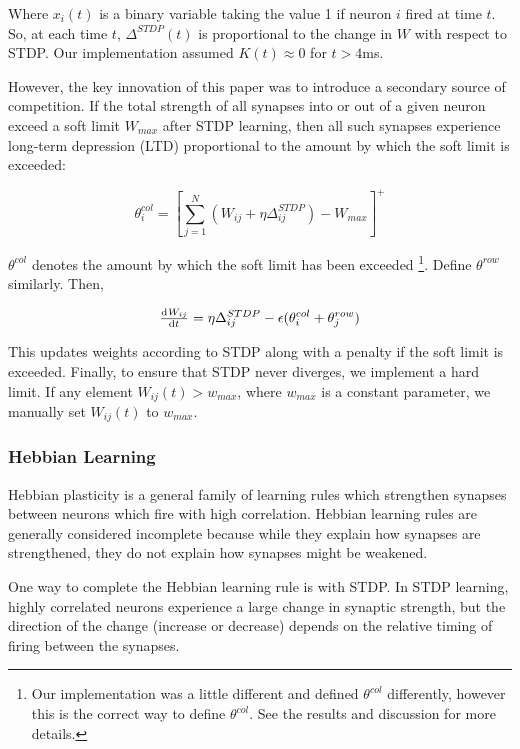Where \(x_i(t)\) is a binary variable taking the value 1 if neuron \(i\) fired at time \(t\). So, at each time \(t\), \(\Delta^{STDP}(t)\) is proportional to the change in \(W\) with respect to STDP. Our implementation assumed \(K(t) \approx 0\) for \(t > 4\)ms.

However, the key innovation of this paper was to introduce a secondary source of competition. If the total strength of all synapses into or out of a given neuron exceed a soft limit \(W_{max}\) after STDP learning, then all such synapses experience long-term depression (LTD) proportional to the amount by which the soft limit is exceeded:

\begin{equation}
\theta^{col}_i =  \left[\sum_{j=1}^N (W_{ij} + \eta\Delta^{STDP}_{ij}) - W_{max}\right]^+
\label{hLTP}
\end{equation}

\(\theta^{col}\) denotes the amount by which the soft limit has been exceeded \footnote{Our implementation was a little different and \cite{Fiete} defined \(\theta^{col}\) differently, however this is the correct way to define \(\theta^{col}\). See the results and discussion for more details.}. Define \(\theta^{row}\) similarly. Then,

\begin{equation}
\od{W_{ij}}{t} = \eta\Delta^{STDP}_{ij} - \epsilon(\theta^{col}_i + \theta^{row}_j)
\label{Learning}
\end{equation}

This updates weights according to STDP along with a penalty if the soft limit is exceeded. Finally, to ensure that STDP never diverges, we implement a hard limit. If any element \(W_{ij}(t) > w_{max}\), where \(w_{max}\) is a constant parameter, we manually set \(W_{ij}(t)\) to \(w_{max}\). 

\subsubsection{Hebbian Learning}

Hebbian plasticity is a general family of learning rules which strengthen synapses between neurons which fire with high correlation. Hebbian learning rules are generally considered incomplete because while they explain how synapses are strengthened, they do not explain how synapses might be weakened. 

One way to complete the Hebbian learning rule is with STDP. In STDP learning, highly correlated neurons experience a large change in synaptic strength, but the direction of the change (increase or decrease) depends on the relative timing of firing between the synapses.

